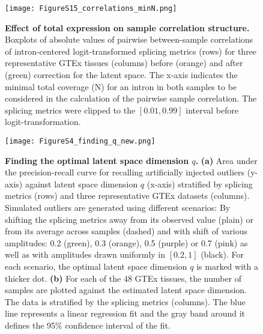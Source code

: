 \documentclass[a4paper,12pt]{article}
\begin{document}
\begin{figure}[h]
\centering
	\texttt{[image: FigureS15\_correlations\_minN.png]}
	\caption{
	    \textbf{Effect of total expression on sample correlation structure.}
Boxplots of absolute values of pairwise between-sample correlations of 
intron-centered logit-transformed splicing metrics (rows) for three representative GTEx tissues (columns)
before (orange) and after (green) correction for the latent space. The x-axis 
indicates the minimal total coverage (N) for an intron in both samples to be 
considered in the calculation of the pairwise sample correlation. The 
splicing metrics were clipped to the $[0.01, 0.99]$ interval before 
logit-transformation.
}
\end{figure}
\pagebreak


\begin{figure}[h]
	\centering
	\texttt{[image: FigureS4\_finding\_q\_new.png]}
	\caption{
	    \textbf{Finding the optimal latent space dimension $q$.}
	    \textbf{(a)} Area under the precision-recall curve  for recalling
artificially injected outliers (y-axis) against latent space dimension 
$q$ (x-axis) stratified by splicing metrics (rows) and three representative 
GTEx datasets (columns). Simulated outliers are generated using different 
scenarios: By shifting the splicing metrics away from its observed value 
(plain) or from its average across samples (dashed) and with shift of various 
amplitudes: 0.2 (green), 0.3 (orange), 0.5 (purple) or 0.7 (pink) as well as with 
amplitudes drawn uniformly in $[0.2,1]$ (black). For each scenario, 
the optimal latent space dimension $q$ is marked with a thicker dot.
\textbf{(b)} For each of the 48 GTEx tissues, 
the number of samples are plotted against the estimated latent
space dimension. The data is stratified by the splicing metrics (columns). 
The blue line represents a linear regression fit and the gray band around it
defines the 95\% confidence interval of the fit.
}
\end{figure}
\pagebreak


\end{document}
